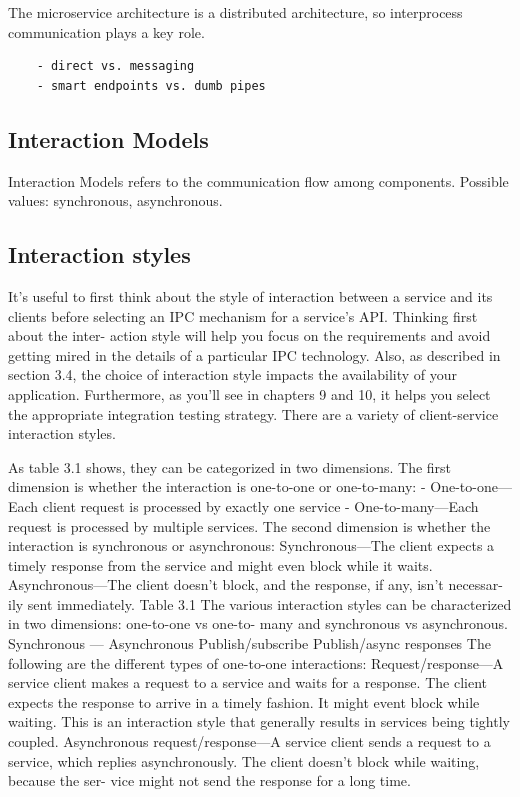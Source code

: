 \documentclass[thesis=M,english,hidelinks]{FITthesis}[2012/10/20]
\begin{document}
The microservice architecture is a distributed architecture, so interprocess communication plays a key role.
\begin{verbatim}
    - direct vs. messaging
    - smart endpoints vs. dumb pipes
\end{verbatim}

\subsection{Interaction Models}
Interaction Models refers to the communication flow among components. Possible values: synchronous, asynchronous.


\subsection{Interaction styles}



It’s useful to first think about the style of interaction between a service and its clients before selecting an IPC mechanism for a service’s API. Thinking first about the inter- action style will help you focus on the requirements and avoid getting mired in the details of a particular IPC technology. Also, as described in section 3.4, the choice of interaction style impacts the availability of your application. Furthermore, as you’ll see in chapters 9 and 10, it helps you select the appropriate integration testing strategy.
There are a variety of client-service interaction styles.



As table 3.1 shows, they can be categorized in two dimensions. The first dimension is whether the interaction is one-to-one or one-to-many:
- One-to-one—Each client request is processed by exactly one service
- One-to-many—Each request is processed by multiple services.
The second dimension is whether the interaction is synchronous or asynchronous:
Synchronous—The client expects a timely response from the service and might even block while it waits.
Asynchronous—The client doesn’t block, and the response, if any, isn’t necessar- ily sent immediately.
Table 3.1 The various interaction styles can be characterized in two dimensions: one-to-one vs one-to- many and synchronous vs asynchronous.
Synchronous —
Asynchronous Publish/subscribe Publish/async responses
The following are the different types of one-to-one interactions:
Request/response—A service client makes a request to a service and waits for a response. The client expects the response to arrive in a timely fashion. It might event block while waiting. This is an interaction style that generally results in services being tightly coupled.
Asynchronous request/response—A service client sends a request to a service, which replies asynchronously. The client doesn’t block while waiting, because the ser- vice might not send the response for a long time.
\end{document}
